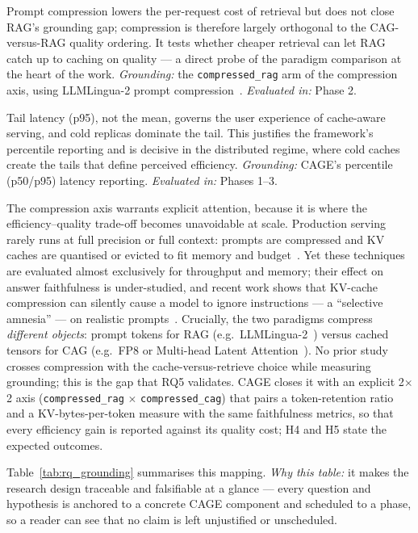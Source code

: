 \begin{compactitem}
  \item[\textbf{H5}] Prompt compression lowers the per-request cost of retrieval but does not close RAG's grounding gap; compression is therefore largely orthogonal to the CAG-versus-RAG quality ordering. It tests whether cheaper retrieval can let RAG catch up to caching on quality --- a direct probe of the paradigm comparison at the heart of the work. \textit{Grounding:} the \texttt{compressed\_rag} arm of the compression axis, using LLMLingua-2 prompt compression~\cite{llmlingua2}. \textit{Evaluated in:} Phase 2.
  \item[\textbf{H6}] Tail latency (p95), not the mean, governs the user experience of cache-aware serving, and cold replicas dominate the tail. This justifies the framework's percentile reporting and is decisive in the distributed regime, where cold caches create the tails that define perceived efficiency. \textit{Grounding:} CAGE's percentile (p50/p95) latency reporting. \textit{Evaluated in:} Phases 1--3.
\end{compactitem}

The compression axis warrants explicit attention, because it is where the
efficiency--quality trade-off becomes unavoidable at scale. Production serving rarely
runs at full precision or full context: prompts are compressed and KV caches are
quantised or evicted to fit memory and budget~\cite{kvcompresssurvey, li2024kvsurvey}.
Yet these techniques are evaluated almost exclusively for throughput and memory; their
effect on answer faithfulness is under-studied, and recent work shows that KV-cache
compression can silently cause a model to ignore instructions --- a ``selective
amnesia'' --- on realistic prompts~\cite{chen2025pitfalls}. Crucially, the two
paradigms compress \textit{different objects}: prompt tokens for RAG (e.g.\
LLMLingua-2~\cite{llmlingua2}) versus cached tensors for CAG (e.g.\ FP8 or Multi-head
Latent Attention~\cite{deepseekv2}). No prior study crosses compression with the
cache-versus-retrieve choice while measuring grounding; this is the gap that RQ5
validates. CAGE closes it with an explicit 2$\times$2 axis (\texttt{compressed\_rag}
$\times$ \texttt{compressed\_cag}) that pairs a token-retention ratio and a
KV-bytes-per-token measure with the same faithfulness metrics, so that every
efficiency gain is reported against its quality cost; H4 and H5 state the expected
outcomes.

Table~\ref{tab:rq_grounding} summarises this mapping. \textit{Why this table:} it makes
the research design traceable and falsifiable at a glance --- every question and
hypothesis is anchored to a concrete CAGE component and scheduled to a phase, so a
reader can see that no claim is left unjustified or unscheduled.


